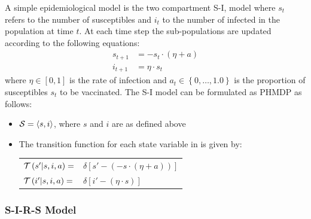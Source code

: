 A simple epidemiological model is the two compartment S-I, model where {\footnotesize $ s_t $} refers to the number of susceptibles and {\footnotesize $ i_t $} to the number of infected in the population at time {\footnotesize $ t $}. At each time step the sub-populations are updated according to the following equations:
{\footnotesize
\begin{align*}
    s_{t + 1} &= - s_t \cdot ( \eta + a ) \\
    i_{t+1} &= \eta \cdot s_t 
\end{align*}
}
where {\footnotesize $ \eta \in [0, 1]$} is the rate of infection and {\footnotesize $ a_t \in \left\lbrace 0, \ldots, 1.0\right\rbrace $} is the proportion of susceptibles {\footnotesize $ s_t $} to be vaccinated. The S-I model can be formulated as PHMDP as follows:
\begin{itemize}
    \item {\footnotesize $ \mathcal{S} = \left\langle s, i \right\rangle$}, where $ s $ and $ i $ are as defined above
    \item The transition function {\footnotesize \Transition} for each state variable in {\footnotesize \State} is given by:    \\
    {\footnotesize 
        \abovedisplayskip=5pt
        \belowdisplayskip=0pt
        \renewcommand{\arraystretch}{1.5}
        \begin{tabular}{ll}
            $ \mathcal{T}\left( s' | s, i, a \right) =$ & $ \delta \left[ s' - (- s \cdot (\eta + a)) \right] $ \\
            $ \mathcal{T}\left( i' | s, i, a \right) =$ & $ \delta \left[ i' - (\eta \cdot s) \right] $ \\
        \end{tabular}
    }%
\end{itemize} 

\subsubsection{S-I-R-S Model}
\label{sec:results_influenza_sirs}

